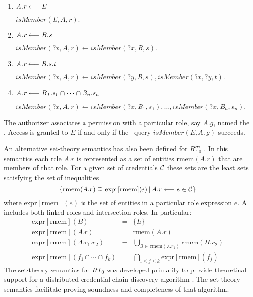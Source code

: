 \begin{enumerate}

\item $\mathit{A.r} \stackrel{}{\longleftarrow} \mathit{E}$

$\textit{isMember}(E, A, r).$

\item $\mathit{A.r} \stackrel{}{\longleftarrow} \mathit{B.s}$

$\textit{isMember}(\textit{?x}, A, r) \leftarrow
 \textit{isMember}(\textit{?x}, B, s).$

\item $\mathit{A.r} \stackrel{}{\longleftarrow} \mathit{B.s.t}$

$\textit{isMember}(\textit{?x}, A, r) \leftarrow
 \textit{isMember}(\textit{?y}, B, s),
 \textit{isMember}(\textit{?x}, \textit{?y}, t).$

\item $\mathit{A.r} \stackrel{}{\longleftarrow} \mathit{B_1.s_1 \cap \cdots \cap B_n.s_n}$

$\textit{isMember}(\textit{?x}, A, r) \leftarrow
 \textit{isMember}(\textit{?x}, B_1, s_1), \ldots,
 \textit{isMember}(\textit{?x}, B_n, s_n).$

\end{enumerate}

The authorizer associates a permission with a particular role, say $A.g$, named the
. Access is granted to $E$ if and only if the \datalog\ query
$\textit{isMember}(E, A, g)$ succeeds.

An alternative set-theory semantics has also been defined for $RT_0$ \cite{Li:DCDTM}. In this
semantics each role $A.r$ is represented as a set of entities $\mbox{rmem}(A.r)$ that are
members of that role. For a given set of credentials $\mathcal{C}$ these sets are the least sets
satisfying the set of inequalities
\begin{displaymath}
\{ \mbox{rmem}(A.r) \supseteq \mbox{expr}[\mbox{rmem}](e)\,|\,
   A.r \longleftarrow e \in \mathcal{C} \}
\end{displaymath}
where $\mbox{expr}[\mbox{rmem}](e)$ is the set of entities in a particular role expression $e$.
A  includes both linked roles and intersection roles. In particular:
\begin{eqnarray*}
\mbox{expr}[\mbox{rmem}](B)        & = & \{B\}            \\
\mbox{expr}[\mbox{rmem}](A.r)      & = & \mbox{rmem}(A.r) \\
\mbox{expr}[\mbox{rmem}](A.r_1.r_2) & = &
  \bigcup_{B \in\, \mbox{rmem}(A.r_1)} \mbox{rmem}(B.r_2) \\
\mbox{expr}[\mbox{rmem}](f_1 \cap \cdots \cap f_k) & = &
  \bigcap_{1 \le j \le k} \mbox{expr}[\mbox{rmem}](f_j)
\end{eqnarray*}
The set-theory semantics for $RT_0$ was developed primarily to provide theoretical support for
a distributed credential chain discovery algorithm \cite{Li:DCDTM}. The set-theory semantics
facilitate proving soundness and completeness of that algorithm.

